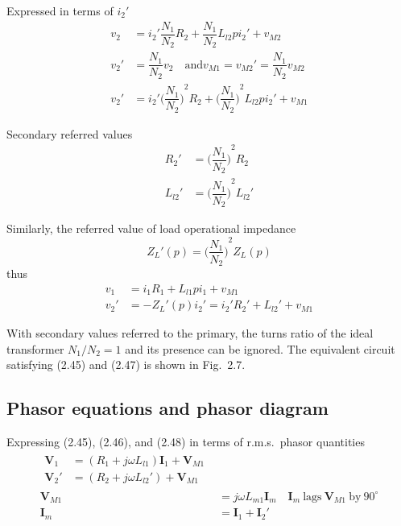 \documentclass[a4paper,numbers=noenddot,12pt]{scrbook}
\begin{document}
                Expressed in terms of $i_2'$
                \begin{align*}
                    v_2 & = i_2' \dfrac{N_1}{N_2} R_2 + \dfrac{N_1}{N_2} L_{l2} p i_2' + v_{M2} \\
                    v_2' & = \dfrac{N_1}{N_2} v_2 \quad \text{and} v_{M1} = v_{M2}' = \dfrac{N_1}{N_2} v_{M2} \\
                    v_2' & = i_2' {\Big(\dfrac{N_1}{N_2}\Big)}^2 R_2 + {\Big(\dfrac{N_1}{N_2}\Big)}^2 L_{l2} p i_2' + v_{M1}
                \end{align*}

                Secondary referred values
                \begin{align*}
                    R_2' & = {\Big(\dfrac{N_1}{N_2}\Big)}^2 R_2 \\
                    L_{l2}' & = {\Big(\dfrac{N_1}{N_2}\Big)}^2 L_{l2}'
                \end{align*}

                Similarly, the referred value of load operational impedance
                \begin{equation*}
                    Z_{L}' (p) = {\Big(\dfrac{N_1}{N_2}\Big)}^2 Z_L (p)
                \end{equation*}
                thus
                \begin{align}
                    v_1 & = i_1 R_1 + L_{l1} p i_1 + v_{M1} \nonumber \\
                    v_2' & = - Z_L' (p) i_2' = i_2' R_2' + L_{l2}' + v_{M1}
                    \label{eq:Eq2.48}
                \end{align}

                With secondary values referred to the primary, the turns ratio of the ideal transformer $N_1/N_2 = 1$ and its presence can be ignored. The equivalent circuit satisfying (2.45) and (2.47) is shown in Fig.\ 2.7. 


                \subsection{Phasor equations and phasor diagram}
                Expressing (2.45), (2.46), and (2.48) in terms of r.m.s.\ phasor quantities
                \begin{align}
                    \begin{split}
                        \mathbf{V}_1 & = (R_1 + j\omega L_{l1}) \mathbf{I}_1 + \mathbf{V}_{M1} \\
                        \mathbf{V}_2' & = (R_2 + j\omega L_{l2}') + \mathbf{V}_{M1}
                    \end{split}\\
                    \mathbf{V}_{M1} & = j\omega L_{m1} \mathbf{I}_m \quad \mathbf{I}_m\ \text{lags}\ \mathbf{V}_{M1} \ \text{by} \ 90^\circ \\
                    \mathbf{I}_m & = \mathbf{I}_1 + \mathbf{I}_2'
                    \label{eq:Eq2.49}
                \end{align}
\end{document}
